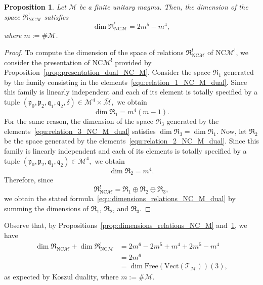 \documentclass[10pt,reqno]{amsart}
\numberwithin{equation}{subsection}
\newtheorem{Proposition}[Theorem]{Proposition}
\newcommand{\Mca}{\mathcal{M}}
\newcommand{\Pfr}{\mathfrak{p}}
\newcommand{\Qfr}{\mathfrak{q}}
\newcommand{\NC}{\mathrm{NC}}
\newcommand{\Vect}{\mathrm{Vect}}
\newcommand{\Free}{\mathrm{Free}}
\newcommand{\Rel}{\mathfrak{R}}
\newcommand{\Triangles}{\mathcal{T}}
\begin{document}
\begin{Proposition} \label{prop:dimensions_relations_NC_M_dual}
    Let $\Mca$ be a finite unitary magma. Then, the dimension of the
    space $\Rel_{\NC\Mca}^!$ satisfies
    \begin{equation} \label{equ:dimensions_relations_NC_M_dual}
        \dim \Rel_{\NC\Mca}^! = 2m^5 - m^4,
    \end{equation}
    where $m := \# \Mca$.
\end{Proposition}
\begin{proof}
    To compute the dimension of the space of relations
    $\Rel_{\NC\Mca}^!$ of $\NC\Mca^!$, we consider the presentation of
    $\NC\Mca^!$ provided by
    Proposition~\ref{prop:presentation_dual_NC_M}. Consider the space
    $\Rel_1$ generated by the family consisting in the
    elements~\eqref{equ:relation_1_NC_M_dual}. Since this family is
    linearly independent and each of its element is totally specified by
    a tuple
    \begin{math}
        (\Pfr_0, \Pfr_2, \Qfr_1, \Qfr_2, \delta)
        \in \Mca^4 \times \bar{\Mca},
    \end{math}
    we obtain
    \begin{equation}
        \dim \Rel_1 = m^4 (m - 1).
    \end{equation}
    For the same reason, the dimension of the space $\Rel_3$
    generated by the elements~\eqref{equ:relation_3_NC_M_dual}
    satisfies $\dim \Rel_3 = \dim \Rel_1$. Now, let $\Rel_2$ be
    the space generated by the
    elements~\eqref{equ:relation_2_NC_M_dual}. Since this family is
    linearly independent and each of its elements is totally specified
    by a tuple
    \begin{math}
        (\Pfr_0, \Pfr_2, \Qfr_1, \Qfr_2) \in \Mca^4,
    \end{math}
    we obtain
    \begin{equation}
        \dim \Rel_2 = m^4.
    \end{equation}
    Therefore, since
    \begin{equation}
        \Rel_{\NC\Mca}^! =
        \Rel_1 \oplus \Rel_2 \oplus \Rel_3,
    \end{equation}
    we obtain the stated
    formula~\eqref{equ:dimensions_relations_NC_M_dual} by summing the
    dimensions of $\Rel_1$, $\Rel_2$, and $\Rel_3$.
\end{proof}
\medskip

Observe that, by Propositions~\ref{prop:dimensions_relations_NC_M}
and~\ref{prop:dimensions_relations_NC_M_dual}, we have
\begin{equation}\begin{split}
    \dim \Rel_{\NC\Mca} + \dim \Rel_{\NC\Mca}^!
        & = 2m^6 - 2m^5 + m^4
          + 2m^5 - m^4 \\
        & = 2m^6 \\
        & = \dim \Free\left(\Vect\left(\Triangles_\Mca\right)\right)(3),
\end{split}\end{equation}
as expected by Koszul duality, where $m := \# \Mca$.
\medskip
\end{document}
